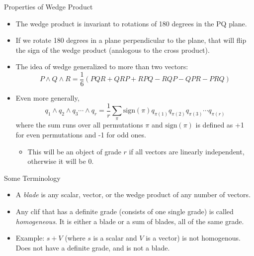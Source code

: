 \documentclass[aspectratio=169,xcolor=dvipsnames]{beamer}
\begin{document}



\begin{frame}{Properties of Wedge Product}


\begin{itemize}
      \item The wedge product is invariant to rotations of 180 degrees in the PQ
            plane.
      \item If we rotate 180 degrees in a plane perpendicular to the plane, that will
            flip the sign of the wedge product (analogous to the cross product).
      \item The idea of wedge generalized to more than two vectors:
            $$P\land Q\land R = \frac{1}{6}(PQR+QRP+RPQ-RQP-QPR-PRQ)$$
      \item Even more generally,
            $$q_1\land q_2\land q_3\cdots\land q_r = \frac{1}{r}\sum_\pi \text{sign}(\pi)
                  q_{\pi(1)}q_{\pi(2)}q_{\pi(3)}\cdots q_{\pi(r)}$$
            where the sum runs over all permutations $\pi$ and $\text{sign}(\pi)$ is defined as +1 for even permutations and -1 for odd ones.
            \begin{itemize}
                  \item This will be an object of grade $r$ if all vectors are linearly
                        independent, otherwise it will be 0.
            \end{itemize}

\end{itemize}
\end{frame}
      


\begin{frame}{Some Terminology}


\begin{itemize}
      \item A \textit{blade} is any scalar, vector, or the wedge product of any number of
            vectors.
      \item Any clif that has a definite grade (consists of one single grade)
            is called \textit{homogeneous}. It is either a blade or a sum of blades,
            all of the same grade.
      \item Example: $s + V$ (where $s$ is a scalar and $V$ is a vector) is not homogenous. 
            Does not have a definite grade, and is not a blade.
\end{itemize}
\end{frame}
      
\end{document}
